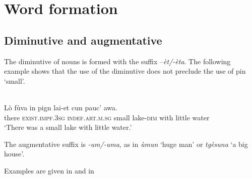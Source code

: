 \chapter{Word formation}


\section{Diminutive and augmentative}
The diminutive of nouns is formed with the suffix –\textit{èt/-èta}. The following example shows that the use of the diminutive does not preclude the use of pin `small'.

\ea\label{ex:1:}
\\
\gll    Lò fůva in pign lai-et cun pauc’ awa.\\
     there \textsc{exist.impf.3sg} \textsc{indef.art.m.sg} small lake-\textsc{dim} with little water \\
\glt `There was a small lake with little water.'
\z

The augmentative suffix is \textit{-um/-uma}, as in \textit{ùmun} `huge man' or \textit{tgèsuna} `a big house'.

{\color{red}
Examples are given in  and in 
}